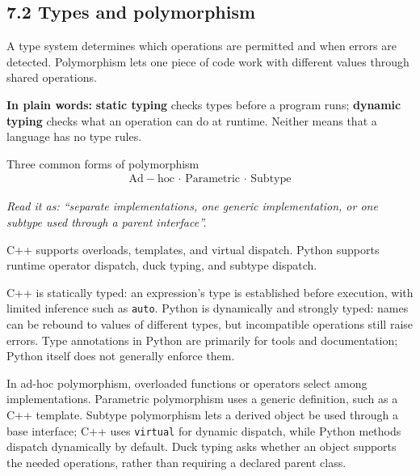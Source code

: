 \documentclass[11pt]{article}
\begin{document}
\begin{keepsection}
\section{7.2 Types and polymorphism}

A type system determines which operations are permitted and when errors are detected. Polymorphism lets one piece of code work with different values through shared operations.

\begin{plainbox}\textbf{In plain words:} \textbf{static typing} checks types before a program runs; \textbf{dynamic typing} checks what an operation can do at runtime. Neither means that a language has no type rules.\end{plainbox}

\begin{equationcard}{Three common forms of polymorphism}
\[ \begin{gathered} \text{Ad}-\text{hoc}\, \cdot \, \text{Parametric}\, \cdot \, \text{Subtype} \end{gathered} \]
{\small \emph{Read it as: “separate implementations, one generic implementation, or one subtype used through a parent interface”.}\par C++ supports overloads, templates, and virtual dispatch. Python supports runtime operator dispatch, duck typing, and subtype dispatch.}
\end{equationcard}

C++ is statically typed: an expression’s type is established before execution, with limited inference such as \texttt{auto}. Python is dynamically and strongly typed: names can be rebound to values of different types, but incompatible operations still raise errors. Type annotations in Python are primarily for tools and documentation; Python itself does not generally enforce them.

In ad-hoc polymorphism, overloaded functions or operators select among implementations. Parametric polymorphism uses a generic definition, such as a C++ template. Subtype polymorphism lets a derived object be used through a base interface; C++ uses \texttt{virtual} for dynamic dispatch, while Python methods dispatch dynamically by default. Duck typing asks whether an object supports the needed operations, rather than requiring a declared parent class.


\end{keepsection}
\end{document}
